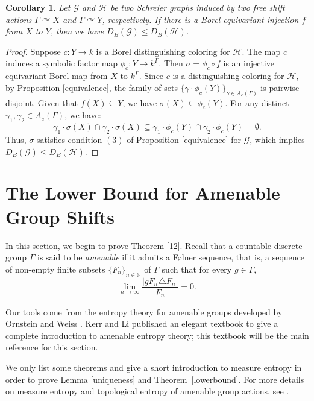 \documentclass[11pt, reqno, a4paper]{amsart}
\theoremstyle{plain}
\newtheorem{corollary}[theorem]{Corollary}
\theoremstyle{definition}
\theoremstyle{remark}
\begin{document}
\begin{corollary}\label{embedding_comparison}
Let $\mathcal{G}$ and $\mathcal{H}$ be two Schreier graphs induced by two free shift actions $\Gamma \curvearrowright X$ and $\Gamma \curvearrowright Y$, respectively. If there is a Borel equivariant injection $f$ from $X$ to $Y$, then we have $D_B(\mathcal{G})\le D_B(\mathcal{H})$. 
\end{corollary}
\begin{proof}
Suppose $c:Y \longrightarrow k$ is a Borel distinguishing coloring for $\mathcal{H}$. The map $c$ induces a symbolic factor map $\phi_c :Y \longrightarrow k^\Gamma$. Then $\sigma=\phi_c \circ f$ is an injective equivariant Borel map from $X$ to $k^\Gamma$. Since $c$ is a distinguishing coloring for $\mathcal{H}$, by Proposition \ref{equivalence}, the family of sets $\{\gamma\cdot \phi_c(Y)\}_{\gamma\in A_e(\Gamma)}$ is pairwise disjoint.
Given that $f(X) \subseteq Y$, we have $\sigma(X) \subseteq \phi_c(Y)$. For any distinct $\gamma_1, \gamma_2 \in A_e(\Gamma)$, we have:
\[ \gamma_1\cdot \sigma(X) \cap \gamma_2\cdot \sigma(X) \subseteq \gamma_1\cdot \phi_c(Y) \cap \gamma_2\cdot \phi_c(Y) = \emptyset. \]
Thus, $\sigma$ satisfies condition $(3)$ of Proposition \ref{equivalence} for $\mathcal{G}$, which implies $D_B(\mathcal{G})\le D_B(\mathcal{H})$.
\end{proof}

\section{The Lower Bound for Amenable Group Shifts}
 
In this section, we begin to prove Theorem \ref{12}. Recall that a countable discrete group $\Gamma$ is said to be \textit{amenable} if it admits a  F{\o}lner sequence, that is, a sequence of non-empty finite subsets $\{F_n\}_{n\in\mathbb{N}}$ of $\Gamma$ such that for every  $
 g\in \Gamma$,
\begin{equation}
    \lim_{n\to\infty} \frac{|gF_n \triangle F_n|}{|F_n|} = 0.
\end{equation}
 
 Our tools come from the entropy theory for amenable groups developed by Ornstein and Weiss \cite{OW87}. Kerr and Li published an elegant textbook \cite{KL16} to give a complete introduction to amenable entropy theory; this textbook will be the main reference for this section.

 We only list some theorems and give a short introduction to measure entropy in order to prove Lemma \ref{uniqueness} and Theorem~\ref{lowerbound}.
  For more details on measure entropy and topological entropy of amenable group actions, see \cite[Definition 9.3 , Definition 9.28]{KL16}.
 
\end{document}
